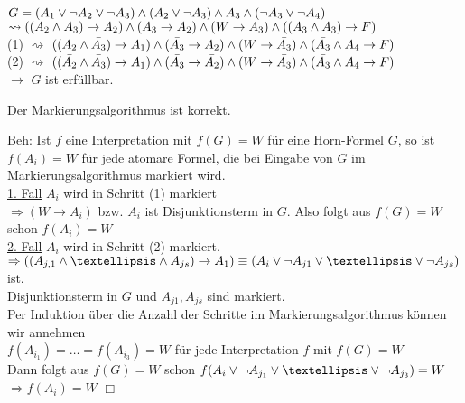 \beispiel{}
$G = (A_1 \vee \neg A_2 \vee \neg A_3) \wedge ( A_2 \vee \neg A_3) \wedge A_3 \wedge ( \neg A_3 \vee \neg A_4)$\\
$\rightsquigarrow ( (A_2 \wedge A_3) \rightarrow A_2) \wedge (A_3 \rightarrow A_2) \wedge ( W \rightarrow A_3) \wedge (( A_3 \wedge A_3) \rightarrow F)$\\
(1) $\rightsquigarrow$ $((A_2 \wedge \bar{A_3}) \rightarrow A_1) \wedge (\bar{A_3} \rightarrow A_2) \wedge (W \rightarrow \bar{A_3}) \wedge (\bar{A_3} \wedge A_4 \rightarrow F)$\\
(2) $\rightsquigarrow$ $((\bar{A_2} \wedge \bar{A_3}) \rightarrow A_1) \wedge ( \bar{A_3} \rightarrow \bar{A_2}) \wedge (W \rightarrow \bar{A_3}) \wedge (\bar{A_3} \wedge A_4 \rightarrow F)$\\
$\rightarrow$ $G$ ist erfüllbar.

 Der Markierungsalgorithmus ist korrekt.

\beweis{}
Beh: Ist $f$ eine Interpretation mit $f(G) = W$ für eine Horn-Formel $G$, so ist $f(A_i ) = W$ für jede atomare Formel, die bei Eingabe von $G$ im Markierungsalgorithmus markiert wird.\\

\underline{1. Fall} $A_i$ wird in Schritt (1) markiert\\
$\Rightarrow (W \rightarrow A_i)$ bzw. $A_i$ ist Disjunktionsterm in $G$. Also folgt aus $f(G) = W$ schon $f(A_i) = W$\\

\underline{2. Fall} $A_i$ wird in Schritt (2) markiert. \\
$\Rightarrow ((A_{j,1} \AND … \AND A_{js}) \rightarrow A_1) \equiv (A_i \OR \neg A_{j1} \OR … \OR \neg A_{js})$ ist.\\

Disjunktionsterm in $G$ und $A_{j1}, A_{js}$ sind markiert.\\
Per Induktion über die Anzahl der Schritte im Markierungsalgorithmus können wir annehmen\\
$f(A_{i_1}) = … = f(A_{i_3}) = W$ für jede Interpretation $f$ mit $f(G) = W$\\
Dann folgt aus $f(G) = W$ schon $f(A_i \OR \neg A_{j_1} \OR … \OR \neg A_{j_3}) = W$
$\Rightarrow f(A_i) = W$ $\Box$